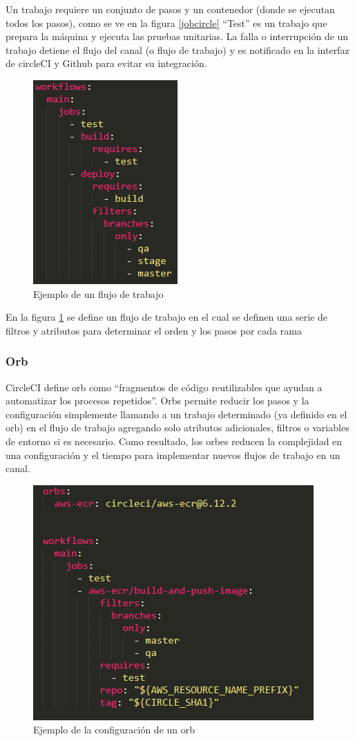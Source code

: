 Un trabajo requiere un conjunto de pasos y un contenedor (donde se ejecutan todos los pasos), como se ve en la figura \ref{jobcircle} ``Test'' es un trabajo que prepara la máquina y ejecuta las pruebas unitarias. La falla o interrupción de un trabajo detiene el flujo del canal (o flujo de trabajo) y es notificado en la interfaz de circleCI y Github para evitar su integración.

\begin {figure} [H]
\centering
\includegraphics [width=0.5\linewidth]{bibliografia/Imagenes/workflow.PNG}
\caption{Ejemplo de un flujo de trabajo}
\label{workflow}
\end {figure}

En la figura \ref{workflow} se define un flujo de trabajo en el cual se definen una serie de filtros y atributos para determinar el orden y los pasos por cada rama

\subsubsection {Orb}

CircleCI \cite {circleci} define orb como ``fragmentos de código reutilizables que ayudan a automatizar los procesos repetidos''. Orbs permite reducir los pasos y la configuración simplemente llamando a un trabajo determinado (ya definido en el orb) en el flujo de trabajo agregando solo atributos adicionales, filtros o variables de entorno si es necesario. Como resultado, los orbes reducen la complejidad en una configuración y el tiempo para implementar nuevos flujos de trabajo en un canal.

\begin{figure}[H]
	\centering
	\includegraphics [width=0.4\linewidth]{bibliografia/Imagenes/orbexample.PNG}
	\caption {Ejemplo de la configuración de un orb}
	\label{orbexample}
\end{figure}

